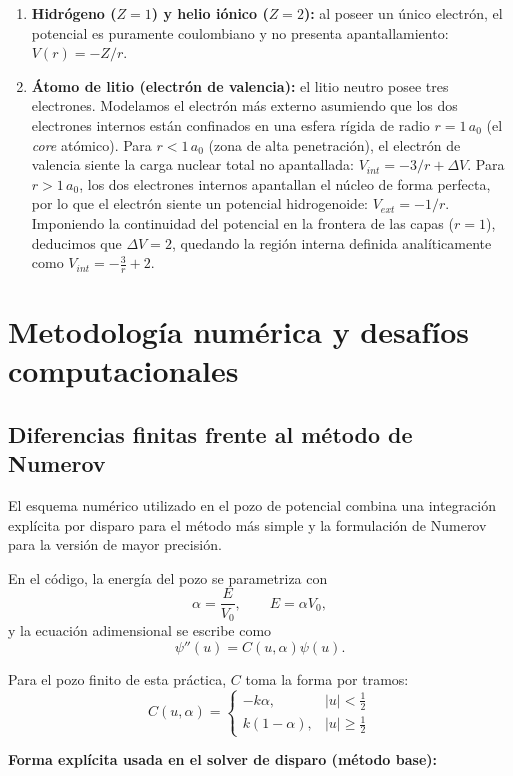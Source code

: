 \documentclass[11pt]{article}
\providecommand{\tightlist}{\setlength{\itemsep}{0pt}\setlength{\parskip}{0pt}}
\begin{document}
\begin{enumerate}
\def\labelenumi{\arabic{enumi}.}
\tightlist
\item
  \textbf{Hidrógeno (\(Z=1\)) y helio iónico (\(Z=2\)):} al poseer un
  único electrón, el potencial es puramente coulombiano y no presenta
  apantallamiento: \(V(r) = -Z/r\).
\item
  \textbf{Átomo de litio (electrón de valencia):} el litio neutro posee
  tres electrones. Modelamos el electrón más externo asumiendo que los
  dos electrones internos están confinados en una esfera rígida de radio
  \(r = 1\,a_0\) (el \emph{core} atómico). Para \(r < 1\,a_0\) (zona de
  alta penetración), el electrón de valencia siente la carga nuclear
  total no apantallada: \(V_{int} = -3/r + \Delta V\). Para
  \(r > 1\,a_0\), los dos electrones internos apantallan el núcleo de
  forma perfecta, por lo que el electrón siente un potencial
  hidrogenoide: \(V_{ext} = -1/r\). Imponiendo la continuidad del
  potencial en la frontera de las capas (\(r=1\)), deducimos que
  \(\Delta V = 2\), quedando la región interna definida analíticamente
  como \(V_{int} = -\frac{3}{r} + 2\).
\end{enumerate}

\section{Metodología numérica y desafíos computacionales}

\subsection{Diferencias finitas frente al método de Numerov}
El esquema numérico utilizado en el pozo de potencial combina una integración explícita por disparo para el método más simple y la formulación de Numerov para la versión de mayor precisión.

En el código, la energía del pozo se parametriza con
\[
\alpha=\frac{E}{V_0}, \qquad E=\alpha V_0,
\]
y la ecuación adimensional se escribe como
\[
\psi''(u)=C(u,\alpha)\psi(u).
\]

Para el pozo finito de esta práctica, \(C\) toma la forma por tramos:
\[
C(u,\alpha)=
\begin{cases}
-k\alpha, & |u|<\frac{1}{2} \\
k(1-\alpha), & |u|\geq\frac{1}{2}
\end{cases}
\]

\textbf{Forma explícita usada en el solver de disparo (método base):}
\end{document}
